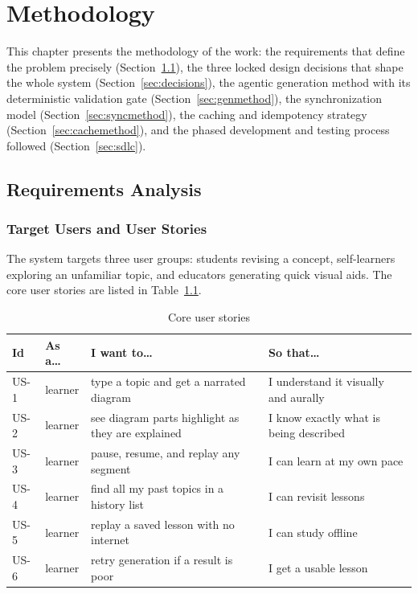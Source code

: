 \chapter{Methodology}
\label{ch:methodology}

This chapter presents the methodology of the work: the requirements that
define the problem precisely (Section~\ref{sec:requirements}), the three
locked design decisions that shape the whole system
(Section~\ref{sec:decisions}), the agentic generation method with its
deterministic validation gate (Section~\ref{sec:genmethod}), the
synchronization model (Section~\ref{sec:syncmethod}), the caching and
idempotency strategy (Section~\ref{sec:cachemethod}), and the phased
development and testing process followed (Section~\ref{sec:sdlc}).

\section{Requirements Analysis}
\label{sec:requirements}

\subsection{Target Users and User Stories}

The system targets three user groups: students revising a concept,
self-learners exploring an unfamiliar topic, and educators generating quick
visual aids. The core user stories are listed in Table~\ref{tab:stories}.

\begin{table}[htbp]
\caption{Core user stories}
\label{tab:stories}
\centering
\small
\renewcommand{\arraystretch}{1.3}
\begin{tabular}{@{}lp{}p{}p{}@{}}
\toprule
\textbf{Id} & \textbf{As a\ldots} & \textbf{I want to\ldots} & \textbf{So that\ldots}\\
\midrule
US-1 & learner & type a topic and get a narrated diagram & I understand it visually and aurally\\
US-2 & learner & see diagram parts highlight as they are explained & I know exactly what is being described\\
US-3 & learner & pause, resume, and replay any segment & I can learn at my own pace\\
US-4 & learner & find all my past topics in a history list & I can revisit lessons\\
US-5 & learner & replay a saved lesson with no internet & I can study offline\\
US-6 & learner & retry generation if a result is poor & I get a usable lesson\\
\bottomrule
\end{tabular}
\end{table}

